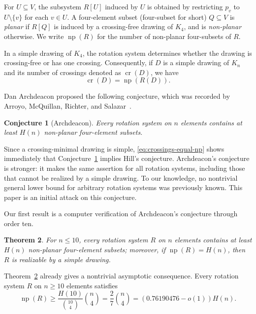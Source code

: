 \documentclass{article}
\theoremstyle{plain}
\newtheorem{theorem}{Theorem}[section]
\newtheorem{conjecture}[theorem]{Conjecture}
\theoremstyle{definition}
\theoremstyle{remark}
\newcommand{\np}{\operatorname{np}}
\begin{document}
For \(U\subseteq V\), the subsystem \(R[U]\) induced by \(U\) is
obtained by restricting \(p_v\) to \(U\setminus\{v\}\) for each
\(v\in U\).  A four-element subset (four-subset for short) \(Q\subseteq V\) is \emph{planar}
if \(R[Q]\) is induced by a crossing-free drawing of \(K_4\), and is
\emph{non-planar} otherwise.  We write \(\np(R)\) for the number of
non-planar four-subsets of \(R\).

In a simple drawing of \(K_4\), the rotation system determines whether
the drawing is crossing-free or has one crossing.  Consequently, if
\(D\) is a simple drawing of \(K_n\) and its number of crossings denoted as \(\operatorname{cr}(D)\), we have
\begin{equation}\label{eq:crossings-equal-np}
\operatorname{cr}(D)=\np(R(D)).
\end{equation}

Dan Archdeacon proposed the following conjecture, which was recorded by Arroyo, McQuillan, Richter, and
Salazar~\cite{ArroyoMcQuillanRichterSalazar2017}.

\begin{conjecture}[Archdeacon]\label{archdeacon}
Every rotation system on \(n\) elements contains at least \(H(n)\)
non-planar four-element subsets.
\end{conjecture}

Since a crossing-minimal drawing is simple,
\eqref{eq:crossings-equal-np} shows immediately that
Conjecture~\ref{archdeacon} implies Hill's conjecture.
Archdeacon's conjecture is stronger: it makes the same assertion for
all rotation systems, including those that cannot be realized by a
simple drawing.  To our knowledge, no nontrivial general lower bound
for arbitrary rotation systems was previously known.
This paper is an initial attack on this conjecture.

Our first result is a computer verification of Archdeacon's conjecture
through order ten.

\begin{theorem}\label{thm:verification}
For \(n\leq 10\), every rotation system \(R\) on \(n\) elements
contains at least \(H(n)\) non-planar four-element subsets;  moreover,
if \(\np(R)=H(n)\), then \(R\) is realizable by a simple drawing.
\end{theorem}

Theorem~\ref{thm:verification} already gives a nontrivial asymptotic
consequence. Every rotation system $R$ on $n\geq 10$ elements satisfies \begin{equation*}
    \np(R)\geq
\frac{H(10)}{\binom{10}{4}}\binom {n}{4}
=\frac27\binom n4
=\left(0.76190476-o(1)\right)H(n).
\end{equation*}
\end{document}
